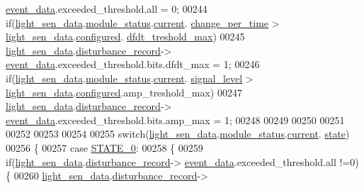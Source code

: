 \begin{DoxyCode}
      \hyperlink{a00028_a8c0bda69e71ef674e60da47ad0be9ab0}{event\_data}.exceeded\_threshold.all = 0;
00244     \textcolor{keywordflow}{if}(\hyperlink{a00047_a53c98c9f84d5cecf0747bbe1f6b83696}{light\_sen\_data}.\hyperlink{a00024_a5a53c391562b059eb744ac679f3765ca}{module\_status}.\hyperlink{a00017_ab8af48cdbba92b3ae39c4470e53af944}{current}.
      \hyperlink{a00017_ad5c4f9a39d2a36632a53205ae8eb5a5d}{change\_per\_time} > \hyperlink{a00047_a53c98c9f84d5cecf0747bbe1f6b83696}{light\_sen\_data}.\hyperlink{a00024_a94b2d1f6ea4ab334c74d24984dd27843}{configured}.
      \hyperlink{a00021_adf9a37828e447378b1d533185213316d}{dfdt\_treshold\_max})
00245         \hyperlink{a00047_a53c98c9f84d5cecf0747bbe1f6b83696}{light\_sen\_data}.\hyperlink{a00024_ac9b38e2c1d3f1013a88d33506c754152}{disturbance\_record}->
      \hyperlink{a00028_a8c0bda69e71ef674e60da47ad0be9ab0}{event\_data}.exceeded\_threshold.bits.dfdt\_max = 1;
00246     \textcolor{keywordflow}{if}(\hyperlink{a00047_a53c98c9f84d5cecf0747bbe1f6b83696}{light\_sen\_data}.\hyperlink{a00024_a5a53c391562b059eb744ac679f3765ca}{module\_status}.\hyperlink{a00017_ab8af48cdbba92b3ae39c4470e53af944}{current}.
      \hyperlink{a00017_abcdf2bc0c2e5a14863938ae28c3bc96e}{signal\_level} > \hyperlink{a00047_a53c98c9f84d5cecf0747bbe1f6b83696}{light\_sen\_data}.\hyperlink{a00024_a94b2d1f6ea4ab334c74d24984dd27843}{configured}.amp\_treshold\_max)
00247         \hyperlink{a00047_a53c98c9f84d5cecf0747bbe1f6b83696}{light\_sen\_data}.\hyperlink{a00024_ac9b38e2c1d3f1013a88d33506c754152}{disturbance\_record}->
      \hyperlink{a00028_a8c0bda69e71ef674e60da47ad0be9ab0}{event\_data}.exceeded\_threshold.bits.amp\_max = 1;
00248 
00249 
00250 
00251 
00252 
00253 
00254  
00255     \textcolor{keywordflow}{switch}(\hyperlink{a00047_a53c98c9f84d5cecf0747bbe1f6b83696}{light\_sen\_data}.\hyperlink{a00024_a5a53c391562b059eb744ac679f3765ca}{module\_status}.\hyperlink{a00017_ab8af48cdbba92b3ae39c4470e53af944}{current}.
      \hyperlink{a00017_a6b8d8e916bc56265a3fd279bd26b6d1b}{state})
00256     \{
00257         \textcolor{keywordflow}{case} \hyperlink{a00021_ad6739dbbe5581cac99b7dc8a5e09949c}{STATE\_0}:
00258         \{
00259             \textcolor{keywordflow}{if}(\hyperlink{a00047_a53c98c9f84d5cecf0747bbe1f6b83696}{light\_sen\_data}.\hyperlink{a00024_ac9b38e2c1d3f1013a88d33506c754152}{disturbance\_record}->
      \hyperlink{a00028_a8c0bda69e71ef674e60da47ad0be9ab0}{event\_data}.exceeded\_threshold.all !=0)\{
00260               \hyperlink{a00047_a53c98c9f84d5cecf0747bbe1f6b83696}{light\_sen\_data}.\hyperlink{a00024_ac9b38e2c1d3f1013a88d33506c754152}{disturbance\_record}->

\end{DoxyCode}
